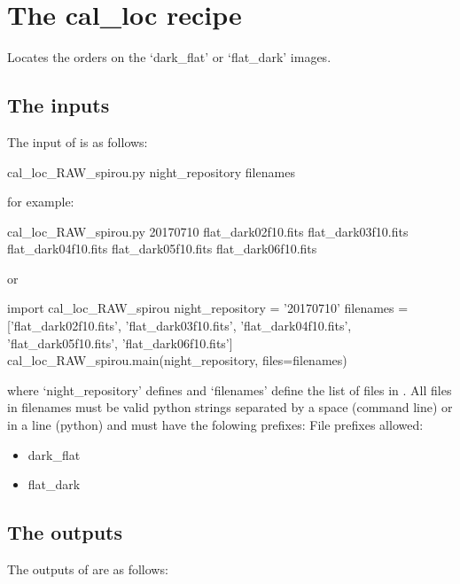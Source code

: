 \clearpage
\newpage
\section{The cal\_loc recipe}
\label{ch:the_recipes:cal_loc_RAW_spirou}

Locates the orders on the `dark\_flat' or `flat\_dark' images.\\

\subsection{The inputs}
The input of \callocRAW is as follows:
\begin{cmdbox}
cal_loc_RAW_spirou.py night_repository filenames
\end{cmdbox}
\noindent for example:
\begin{cmdbox}[title={example}]
cal_loc_RAW_spirou.py 20170710 flat_dark02f10.fits flat_dark03f10.fits flat_dark04f10.fits flat_dark05f10.fits flat_dark06f10.fits
\end{cmdbox}
\noindent or
\begin{pythonbox}
import cal_loc_RAW_spirou
night_repository = '20170710'
filenames = ['flat_dark02f10.fits', 'flat_dark03f10.fits', 'flat_dark04f10.fits',
             'flat_dark05f10.fits', 'flat_dark06f10.fits']
cal_loc_RAW_spirou.main(night_repository, files=filenames)
\end{pythonbox}

\noindent where `night\_repository' defines \argnightname and `filenames' define the list of files in \argfilenames. All files in filenames must be valid python strings separated by a space (command line) or in a line (python) and must have the folowing prefixes:
\noindent File prefixes allowed:
\begin{itemize}
	\item dark\_flat
	\item flat\_dark
\end{itemize}

\subsection{The outputs}
The outputs of \callocRAW are as follows:

